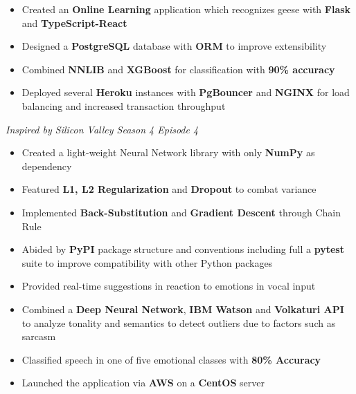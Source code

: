 \documentclass[10pt,a4paper,ragged2e]{altacv}
\begin{document}
\divider

\begin{itemize}
    \item Created an \textbf{Online Learning} application which recognizes geese with \textbf{Flask} and \textbf{TypeScript-React}
    \item Designed a \textbf{PostgreSQL} database with \textbf{ORM} to improve extensibility
    \item Combined \textbf{NNLIB} and \textbf{XGBoost} for classification with \textbf{90\% accuracy}
    \item Deployed several \textbf{Heroku} instances with \textbf{PgBouncer} and \textbf{NGINX} for load balancing and increased transaction throughput
\end{itemize}
\textit{Inspired by Silicon Valley Season 4 Episode 4}

\divider

\begin{itemize}
    \item Created a light-weight Neural Network library with only \textbf{NumPy} as dependency
    \item Featured \textbf{L1, L2 Regularization} and \textbf{Dropout} to combat variance
    \item Implemented \textbf{Back-Substitution} and \textbf{Gradient Descent} through Chain Rule
    \item Abided by \textbf{PyPI} package structure and conventions including full a \textbf{pytest} suite to improve compatibility with other Python packages
\end{itemize}

\divider

\begin{itemize}
    \item Provided real-time suggestions in reaction to emotions in vocal input
    \item Combined a \textbf{Deep Neural Network}, \textbf{IBM Watson} and \textbf{Volkaturi API} to analyze tonality and semantics to detect outliers due to factors such as sarcasm
    \item Classified speech in one of five emotional classes with \textbf{80\% Accuracy}
    \item Launched the application via \textbf{AWS} on a \textbf{CentOS} server
\end{itemize}
\end{document}
